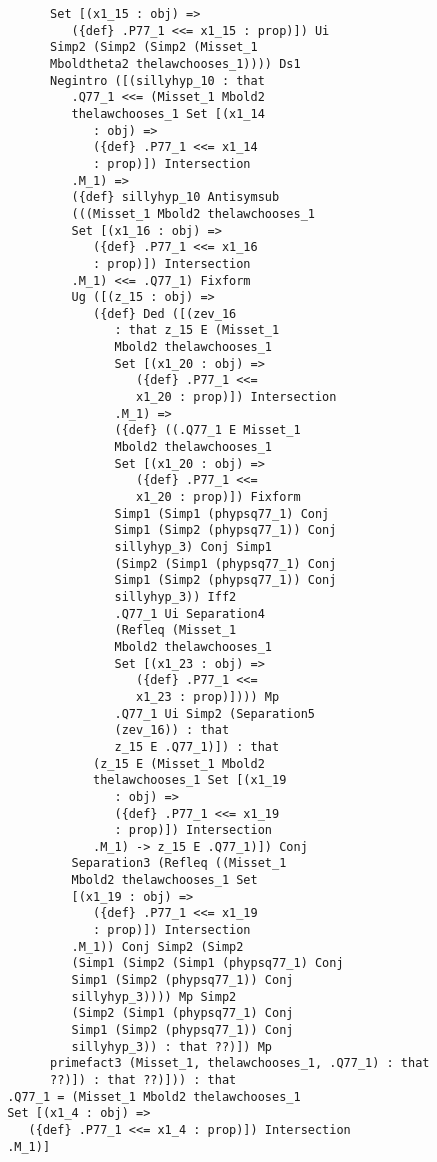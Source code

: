 \documentclass[12pt]{article}
\begin{document}
\begin{verbatim}
             Set [(x1_15 : obj) => 
                ({def} .P77_1 <<= x1_15 : prop)]) Ui 
             Simp2 (Simp2 (Simp2 (Misset_1 
             Mboldtheta2 thelawchooses_1)))) Ds1 
             Negintro ([(sillyhyp_10 : that 
                .Q77_1 <<= (Misset_1 Mbold2 
                thelawchooses_1 Set [(x1_14 
                   : obj) => 
                   ({def} .P77_1 <<= x1_14 
                   : prop)]) Intersection 
                .M_1) => 
                ({def} sillyhyp_10 Antisymsub 
                (((Misset_1 Mbold2 thelawchooses_1 
                Set [(x1_16 : obj) => 
                   ({def} .P77_1 <<= x1_16 
                   : prop)]) Intersection 
                .M_1) <<= .Q77_1) Fixform 
                Ug ([(z_15 : obj) => 
                   ({def} Ded ([(zev_16 
                      : that z_15 E (Misset_1 
                      Mbold2 thelawchooses_1 
                      Set [(x1_20 : obj) => 
                         ({def} .P77_1 <<= 
                         x1_20 : prop)]) Intersection 
                      .M_1) => 
                      ({def} ((.Q77_1 E Misset_1 
                      Mbold2 thelawchooses_1 
                      Set [(x1_20 : obj) => 
                         ({def} .P77_1 <<= 
                         x1_20 : prop)]) Fixform 
                      Simp1 (Simp1 (phypsq77_1) Conj 
                      Simp1 (Simp2 (phypsq77_1)) Conj 
                      sillyhyp_3) Conj Simp1 
                      (Simp2 (Simp1 (phypsq77_1) Conj 
                      Simp1 (Simp2 (phypsq77_1)) Conj 
                      sillyhyp_3)) Iff2 
                      .Q77_1 Ui Separation4 
                      (Refleq (Misset_1 
                      Mbold2 thelawchooses_1 
                      Set [(x1_23 : obj) => 
                         ({def} .P77_1 <<= 
                         x1_23 : prop)]))) Mp 
                      .Q77_1 Ui Simp2 (Separation5 
                      (zev_16)) : that 
                      z_15 E .Q77_1)]) : that 
                   (z_15 E (Misset_1 Mbold2 
                   thelawchooses_1 Set [(x1_19 
                      : obj) => 
                      ({def} .P77_1 <<= x1_19 
                      : prop)]) Intersection 
                   .M_1) -> z_15 E .Q77_1)]) Conj 
                Separation3 (Refleq ((Misset_1 
                Mbold2 thelawchooses_1 Set 
                [(x1_19 : obj) => 
                   ({def} .P77_1 <<= x1_19 
                   : prop)]) Intersection 
                .M_1)) Conj Simp2 (Simp2 
                (Simp1 (Simp2 (Simp1 (phypsq77_1) Conj 
                Simp1 (Simp2 (phypsq77_1)) Conj 
                sillyhyp_3)))) Mp Simp2 
                (Simp2 (Simp1 (phypsq77_1) Conj 
                Simp1 (Simp2 (phypsq77_1)) Conj 
                sillyhyp_3)) : that ??)]) Mp 
             primefact3 (Misset_1, thelawchooses_1, .Q77_1) : that 
             ??)]) : that ??)])) : that 
       .Q77_1 = (Misset_1 Mbold2 thelawchooses_1 
       Set [(x1_4 : obj) => 
          ({def} .P77_1 <<= x1_4 : prop)]) Intersection 
       .M_1)]


\end{verbatim}
\end{document}
